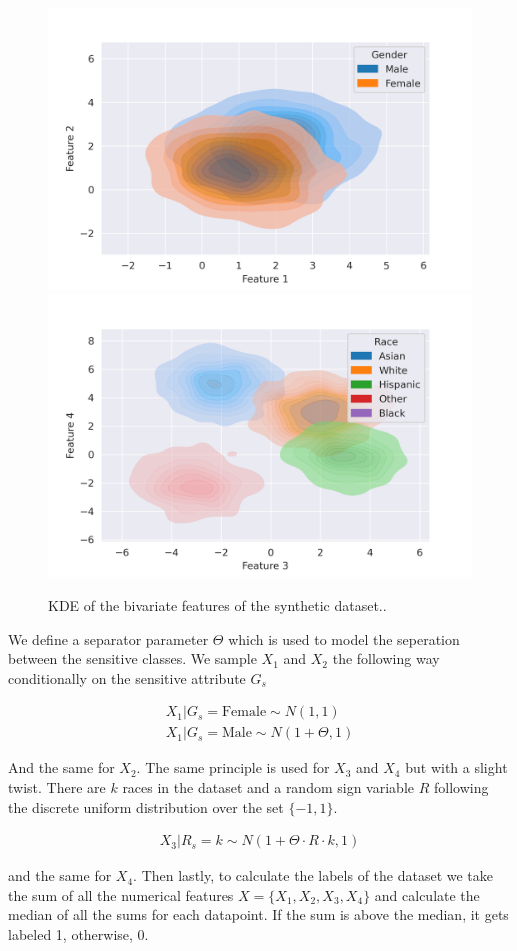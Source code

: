 \begin{figure}
    \centering
    \includegraphics[width=0.49\linewidth]{figures/synthetic-gender.png}
    \includegraphics[width=0.49\linewidth]{figures/synthetic-race.png}
    \caption{KDE of the bivariate features of the synthetic dataset..}
    \label{fig:synthdatasetfeatures}
\end{figure}


We define a separator parameter $\Theta$ which is used to model the seperation between the sensitive classes. We sample $X_1$ and $X_2$ the following way conditionally on the sensitive attribute $G_s$

\begin{equation*}
    \begin{aligned}
           X_1 | G_s = \text{Female} \sim N(1, 1) \\ 
           X_1 | G_s = \text{Male} \sim N(1 + \Theta, 1)
    \end{aligned}
\end{equation*}

And the same for $X_2$. The same principle is used for $X_3$ and $X_4$ but with a slight twist. There are $k$ races in the dataset and a random sign variable $R$ following the discrete uniform distribution over the set $\{-1, 1\}$.

\begin{equation*}
    \begin{aligned}
        X_3 | R_s = k \sim N(1 + \Theta \cdot R \cdot k, 1)
    \end{aligned}
\end{equation*}

and the same for $X_4$. Then lastly, to calculate the labels of the dataset we take the sum of all the numerical features $X = \{ X_1, X_2, X_3, X_4 \}$ and calculate the median of all the sums for each datapoint. If the sum is above the median, it gets labeled 1, otherwise, 0.

